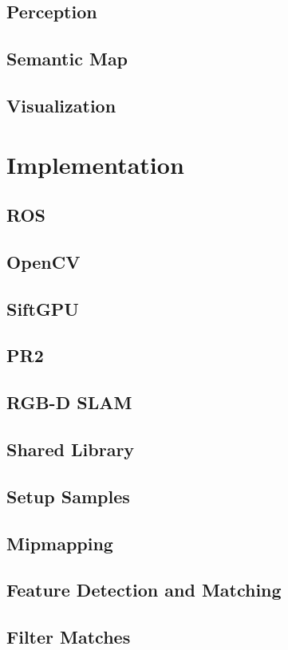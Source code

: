 \documentclass[11pt, twoside, a4paper]{report}
\begin{document}
\subsection{Perception}
\subsection{Semantic Map}
\subsection{Visualization}

\newpage
\section{Implementation}
\subsection{ROS}
\subsection{OpenCV}
\subsection{SiftGPU}
\subsection{PR2}
\subsection{RGB-D SLAM}
\subsection{Shared Library}
\subsection{Setup Samples}
\subsection{Mipmapping}
\subsection{Feature Detection and Matching}
\subsection{Filter Matches}
\end{document}

